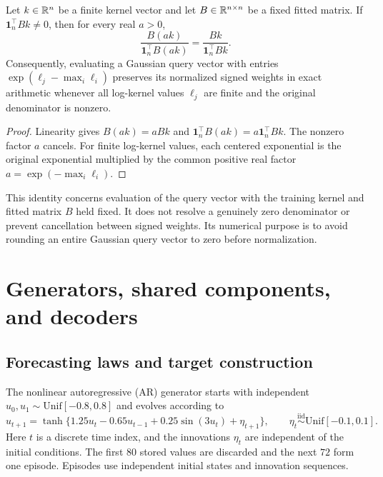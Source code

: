 \begin{proposition}
\label{c:prop:inner-scaling}
Let $k\in\mathbb{R}^n$ be a finite kernel vector and let $B\in\mathbb{R}^{n\times n}$
be a fixed fitted matrix. If $\boldsymbol1_n^\top Bk\ne0$, then for
every real $a>0$,
\[
 \frac{B(ak)}{\boldsymbol1_n^\top B(ak)}
 =\frac{Bk}{\boldsymbol1_n^\top Bk}.
\]
Consequently, evaluating a Gaussian query vector with entries
$\exp(\ell_j-\max_i\ell_i)$ preserves its normalized signed weights
in exact arithmetic whenever all log-kernel values $\ell_j$ are finite
and the original denominator is nonzero.
\end{proposition}
\begin{proof}
Linearity gives $B(ak)=aBk$ and
$\boldsymbol1_n^\top B(ak)=a\boldsymbol1_n^\top Bk$. The nonzero
factor $a$ cancels. For finite log-kernel values, each centered
exponential is the original exponential multiplied by the common
positive real factor $a=\exp(-\max_i\ell_i)$.
\end{proof}

This identity concerns evaluation of the query vector with the training
kernel and fitted matrix $B$ held fixed. It does not resolve a genuinely
zero denominator or prevent cancellation between signed weights. Its
numerical purpose is to avoid rounding an entire Gaussian query vector
to zero before normalization.

\section{Generators, shared components, and decoders}\label{c:app:methods}

\subsection{Forecasting laws and target construction}

The nonlinear autoregressive (AR) generator starts with independent
$u_0,u_1\sim\mathrm{Unif}[-0.8,0.8]$ and evolves according to
\[
 u_{t+1}=\tanh\{1.25u_t-0.65u_{t-1}
                   +0.25\sin(3u_t)+\eta_{t+1}\},\qquad
 \eta_t\stackrel{\mathrm{iid}}\sim\mathrm{Unif}[-0.1,0.1].
\]
Here $t$ is a discrete time index, and the innovations $\eta_t$ are
independent of the initial conditions. The first $80$ stored values are
discarded and the next $72$ form one episode. Episodes use independent
initial states and innovation sequences.

